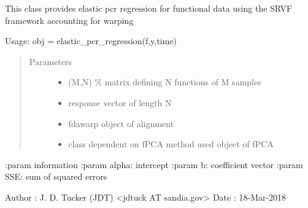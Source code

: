 \documentclass[letterpaper,10pt,english]{sphinxmanual}
\begin{document}

\begin{fulllineitems}
\label{\detokenize{pcr_regression:pcr_regression.elastic_pcr_regression}}
This class provides elastic pcr regression for functional data using the
SRVF framework accounting for warping

Usage:  obj = elastic\_pcr\_regression(f,y,time)
\begin{quote}\begin{description}
\item[{Parameters}] \leavevmode\begin{itemize}
\item {} 
 \textendash{} (M,N) \% matrix defining N functions of M samples

\item {} 
 \textendash{} response vector of length N

\item {} 
 \textendash{} fdawarp object of alignment

\item {} 
 \textendash{} class dependent on fPCA method used object of fPCA

\end{itemize}

\end{description}\end{quote}

:param information
:param alpha: intercept
:param b: coefficient vector
:param SSE: sum of squared errors

Author :  J. D. Tucker (JDT) \textless{}jdtuck AT sandia.gov\textgreater{}
Date   :  18-Mar-2018


\end{fulllineitems}
\end{document}

